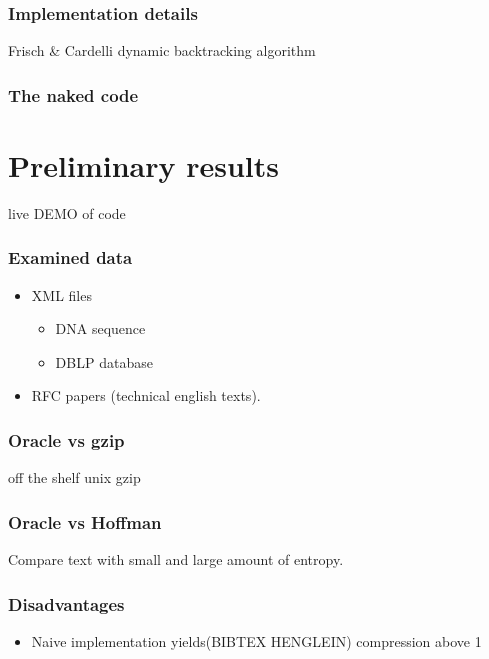 \documentclass[slidestop,compress,mathserif, xcolor=table]{beamer}
\begin{document}
\begin{frame}
  \frametitle{Implementation details}
  
  Frisch \& Cardelli dynamic backtracking algorithm

\end{frame}

\begin{frame}
  \frametitle{The naked code}
  
\end{frame}

\section{Preliminary results}

\begin{frame}
  \begin{center}
    \huge{live DEMO of code}
  \end{center}
\end{frame}

\begin{frame}
  \frametitle{Examined data}
  \begin{itemize}
  \item XML files
    
    \begin{itemize}
    \item DNA sequence
      
    \item DBLP database
    \end{itemize}

  \item RFC papers (technical english texts).
    
  \end{itemize}
\end{frame}

\begin{frame}
  \frametitle{Oracle vs gzip}
  
  off the shelf unix gzip
\end{frame}

\begin{frame}
  \frametitle{Oracle vs Hoffman}
  Compare text with small and large amount of entropy.
\end{frame}

\begin{frame}
  \frametitle{Disadvantages}

  \begin{itemize}
  \item Naive implementation yields(BIBTEX HENGLEIN) compression above 1
  \end{itemize}

\end{frame}
\end{document}
